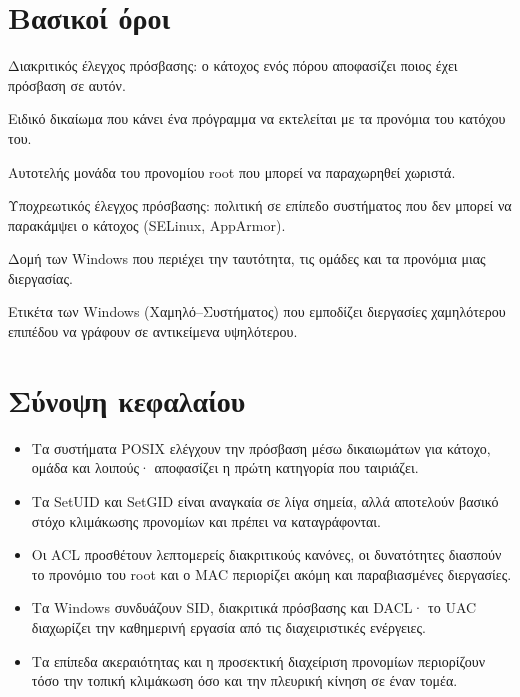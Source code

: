 \section*{Βασικοί όροι}
\begin{description}[style=nextline,leftmargin=1.2em]
  \item[DAC] Διακριτικός έλεγχος πρόσβασης: ο κάτοχος ενός πόρου αποφασίζει ποιος έχει πρόσβαση σε αυτόν.
  \item[SetUID] Ειδικό δικαίωμα που κάνει ένα πρόγραμμα να εκτελείται με τα προνόμια του κατόχου του.
  \item[Δυνατότητα (capability)] Αυτοτελής μονάδα του προνομίου root που μπορεί να παραχωρηθεί χωριστά.
  \item[MAC] Υποχρεωτικός έλεγχος πρόσβασης: πολιτική σε επίπεδο συστήματος που δεν μπορεί να παρακάμψει ο κάτοχος (SELinux, AppArmor).
  \item[Διακριτικό πρόσβασης] Δομή των Windows που περιέχει την ταυτότητα, τις ομάδες και τα προνόμια μιας διεργασίας.
  \item[Επίπεδο ακεραιότητας] Ετικέτα των Windows (Χαμηλό–Συστήματος) που εμποδίζει διεργασίες χαμηλότερου επιπέδου να γράφουν σε αντικείμενα υψηλότερου.
\end{description}

\section*{Σύνοψη κεφαλαίου}
\begin{itemize}
  \item Τα συστήματα POSIX ελέγχουν την πρόσβαση μέσω δικαιωμάτων για κάτοχο, ομάδα και λοιπούς· αποφασίζει η πρώτη κατηγορία που ταιριάζει.
  \item Τα SetUID και SetGID είναι αναγκαία σε λίγα σημεία, αλλά αποτελούν βασικό στόχο κλιμάκωσης προνομίων και πρέπει να καταγράφονται.
  \item Οι ACL προσθέτουν λεπτομερείς διακριτικούς κανόνες, οι δυνατότητες διασπούν το προνόμιο του root και ο MAC περιορίζει ακόμη και παραβιασμένες διεργασίες.
  \item Τα Windows συνδυάζουν SID, διακριτικά πρόσβασης και DACL· το UAC διαχωρίζει την καθημερινή εργασία από τις διαχειριστικές ενέργειες.
  \item Τα επίπεδα ακεραιότητας και η προσεκτική διαχείριση προνομίων περιορίζουν τόσο την τοπική κλιμάκωση όσο και την πλευρική κίνηση σε έναν τομέα.
\end{itemize}

